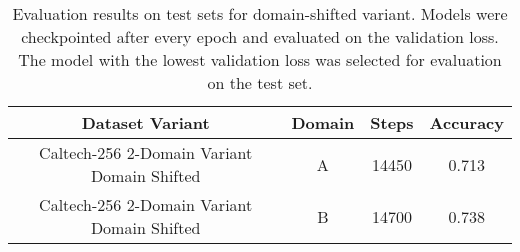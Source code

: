 \begin{table}[ht]
\centering
\caption{Evaluation results on test sets for domain-shifted variant. Models were checkpointed after every epoch and evaluated on the validation loss. The model with the lowest validation loss was selected for evaluation on the test set.}
\label{tab:evaluation_results_domain_shifted}
\begin{tabular}{cccc}
\toprule
Dataset Variant & Domain & Steps & Accuracy \\
\midrule
Caltech-256 2-Domain Variant Domain Shifted & A & 14450 & 0.713 \\
Caltech-256 2-Domain Variant Domain Shifted & B & 14700 & 0.738 \\
\bottomrule
\end{tabular}
\end{table}

